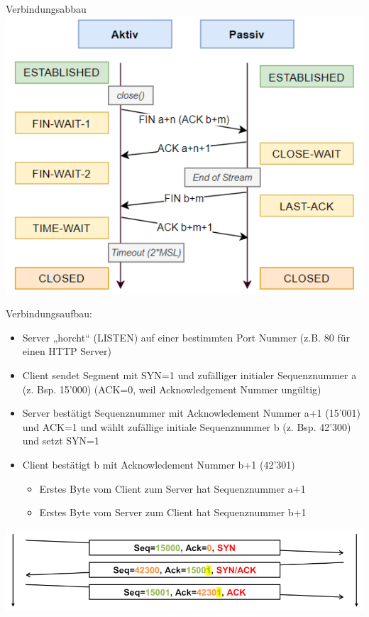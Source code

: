 \begin{KR}{Verbindungsabbau}\\
        \includegraphics[width=1\linewidth]{images/Verbindungsabbau.png}
\end{KR}

\begin{example}
    Verbindungsaufbau:
    \begin{itemize}
        \item Server „horcht“ (LISTEN) auf einer bestimmten Port Nummer (z.B. 80 für einen HTTP Server)
        \item Client sendet Segment mit SYN=1 und zufälliger initialer Sequenznummer a (z. Bsp. 15'000) (ACK=0, weil Acknowledgement Nummer ungültig)
        \item Server bestätigt Sequenznummer mit Acknowledement Nummer a+1 (15'001) und ACK=1 und wählt zufällige initiale Sequenznummer b (z. Bsp. 42'300) und setzt SYN=1
        \item Client bestätigt b mit Acknowledement Nummer b+1 (42'301)
        \begin{itemize}
            \item Erstes Byte vom Client zum Server hat Sequenznummer a+1
            \item Erstes Byte vom Server zum Client hat Sequenznummer b+1
        \end{itemize}
    \end{itemize}
        \includegraphics[width=0.75\linewidth]{images/example_verbindungsaufbau_tcp.png}
\end{example}

